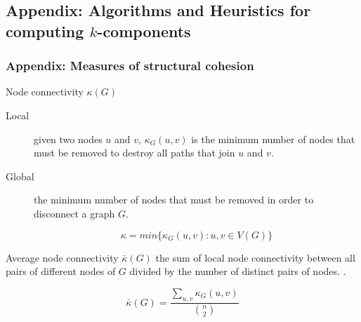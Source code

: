 \documentclass[ignorenonframetext,red,8pt,notes=hide]{beamer}
\begin{document}
\subsection{Appendix: Algorithms and Heuristics for computing $k$-components}

\begin{frame}
\frametitle{Appendix: Measures of structural cohesion}

\begin{block}{Node connectivity $\kappa(G)$}
\begin{description}
\item[Local] given two nodes $u$ and $v$, $\kappa_{G}(u,v)$ is the minimum number of nodes that must be removed to destroy all paths that join $u$ and $v$.

\item[Global] the minimum number of nodes that must be removed in order to disconnect a graph $G$.

\begin{equation*}
\kappa = min{\{\kappa_{G}(u,v):u,v \in V(G)\}}
\end{equation*}

\end{description}

\end{block}

\begin{block}{Average node connectivity $\bar{\kappa}(G)$}
the sum of local node connectivity between all pairs of different nodes of $G$ divided by the number of distinct pairs of nodes. \citep*{beineke:2002}.

\begin{equation*}
\bar{\kappa}(G) = \frac{\sum_{u,v} \kappa_{G}(u,v)}{{n \choose 2}}
\end{equation*}
\end{block}

\end{frame}
\end{document}
